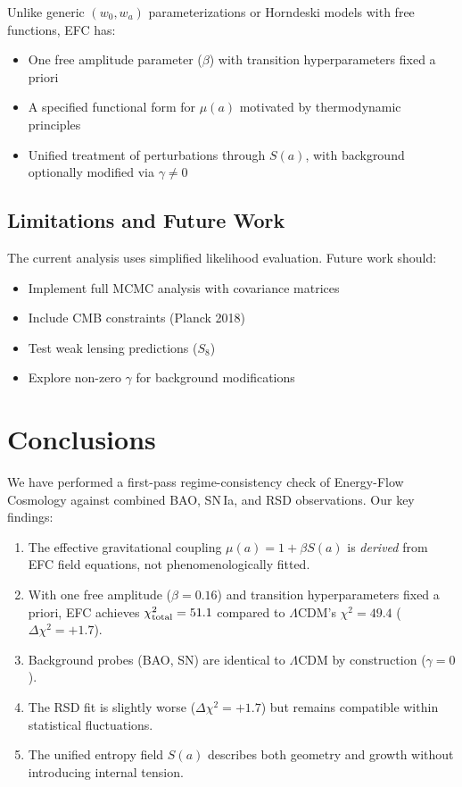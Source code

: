 \documentclass[12pt,a4paper]{article}
\begin{document}
Unlike generic $(w_0, w_a)$ parameterizations or Horndeski models with free functions, 
EFC has:
\begin{itemize}
\item One free amplitude parameter ($\beta$) with transition hyperparameters fixed a priori
\item A specified functional form for $\mu(a)$ motivated by thermodynamic principles
\item Unified treatment of perturbations through $S(a)$, with background optionally 
modified via $\gamma \neq 0$
\end{itemize}

\subsection{Limitations and Future Work}

The current analysis uses simplified likelihood evaluation. Future work should:
\begin{itemize}
\item Implement full MCMC analysis with covariance matrices
\item Include CMB constraints (Planck 2018)
\item Test weak lensing predictions ($S_8$)
\item Explore non-zero $\gamma$ for background modifications
\end{itemize}

\section{Conclusions}

We have performed a first-pass regime-consistency check of Energy-Flow Cosmology against 
combined BAO, SN\,Ia, and RSD observations. Our key findings:

\begin{enumerate}
\item The effective gravitational coupling $\mu(a) = 1 + \beta S(a)$ is \emph{derived} 
from EFC field equations, not phenomenologically fitted.

\item With one free amplitude ($\beta = 0.16$) and transition hyperparameters fixed 
a priori, EFC achieves $\chi^2_{\rm total} = 51.1$ compared to $\Lambda$CDM's 
$\chi^2 = 49.4$ ($\Delta\chi^2 = +1.7$).

\item Background probes (BAO, SN) are identical to $\Lambda$CDM by construction 
($\gamma = 0$).

\item The RSD fit is slightly worse ($\Delta\chi^2 = +1.7$) but remains compatible 
within statistical fluctuations.

\item The unified entropy field $S(a)$ describes both geometry and growth without 
introducing internal tension.
\end{enumerate}
\end{document}
